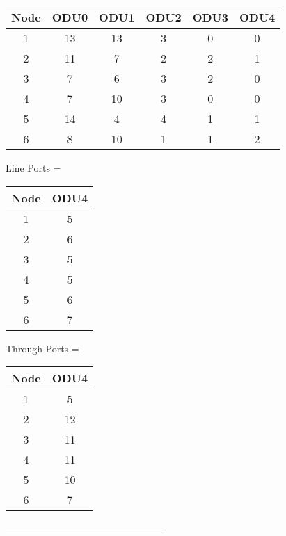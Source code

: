 \begin{tabular}{|c|c|c|c|c|c|}
  \hline
  Node & ODU0 & ODU1 & ODU2 & ODU3 & ODU4 \\
  \hline\hline
  1 & 13 & 13 & 3 & 0 & 0 \\
  2 & 11 & 7 & 2 & 2 & 1 \\
  3 & 7 & 6 & 3 & 2 & 0 \\
  4 & 7 & 10 & 3 & 0 & 0 \\
  5 & 14 & 4 & 4 & 1 & 1 \\
  6 & 8 & 10 & 1 & 1 & 2 \\
  \hline
\end{tabular}

\vspace{15pt}

Line Ports =\\


\begin{tabular}{|c|c|}
  \hline
  Node & ODU4 \\
  \hline\hline
  1 & 5 \\
  2 & 6 \\
  3 & 5 \\
  4 & 5 \\
  5 & 6 \\
  6 & 7 \\
  \hline
\end{tabular}

\vspace{11pt}

Through Ports = \\


\begin{tabular}{|c|c|}
  \hline
  Node & ODU4 \\
  \hline\hline
  1 & 5 \\
  2 & 12 \\
  3 & 11 \\
  4 & 11 \\
  5 & 10 \\
  6 & 7 \\
  \hline
\end{tabular}

\vspace{11pt}

-------------------------------------------------- \\

